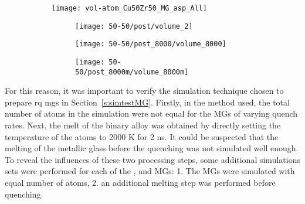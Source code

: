 \begin{figure}%
	\centering
	\begin{subfigure}{\linewidth} \centering
		\texttt{[image: vol-atom\_Cu50Zr50\_MG\_asp\_All]}
	\end{subfigure}	%
	\vfill
	\begin{subfigure}{\textwidth} \centering
		\begin{subfigure}{0.33\textwidth} \centering \renewcommand{}
			\texttt{[image: 50-50/post/volume\_2]} \caption{}
		\end{subfigure}%
		\begin{subfigure}{0.33\textwidth} \centering \renewcommand{} 	\addtocounter{subfigure}{-1}
			\texttt{[image: 50-50/post\_8000/volume\_8000]} \caption{}
		\end{subfigure}%
		\begin{subfigure}{0.33\textwidth} \centering  \renewcommand{} \addtocounter{subfigure}{-1}
			\texttt{[image: 50-50/post\_8000m/volume\_8000m]} \caption{}
		\end{subfigure}
		\addtocounter{subfigure}{-1}
	\end{subfigure}
	\label{f:vol_quench}
\end{figure}

For this reason, it was important to verify the simulation technique chosen to prepare \gls{rq} \gls{mg}s in Section~\ref{s:simtestMG}. Firstly, in the method used, the total number of atoms in the simulation were not equal for the MGs of varying quench rates. Next, the melt of the binary alloy was obtained by directly setting the temperature of the atoms to 2000 K for 2 ns. It could be suspected that the melting of the metallic glass before the quenching was not simulated well enough. To reveal the influences of these two processing steps, some additional simulations sets were performed for each of the ,  and  MGs: 1. The MGs were simulated with equal number of atoms, 2. an additional melting step was performed before quenching. \par 

